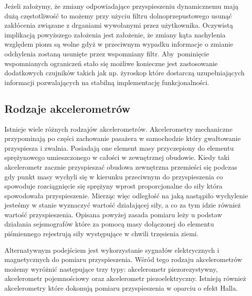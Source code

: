 Jeżeli założymy, że zmiany odpowiadające przyspieszeniu dynamicznemu mają dużą
częstotliwość to możemy przy użyciu filtru dolnoprzepustowego usunąć zakłócenia
związane z drganiami wywołanymi przez użytkownika. Oczywistą implikacją
powyższego założenia jest założenie, że zmiany kąta nachylenia względem pionu są
wolne gdyż w przeciwnym wypadku informacje o zmianie odchylenia zostaną
usunięte przez wspomniany filtr. Aby~pominięcie wspomnianych ograniczeń stało się możliwe
konieczne jest zastosowanie dodatkowych czujników takich jak np. żyroskop które
dostarczą uzupełniających informacji pozwalających na stabilną implementację
funkcjonalności.
\subsection{Rodzaje akcelerometrów}
Istnieje wiele różnych rodzajów akcelerometrów. Akcelerometry mechaniczne
przypominają po części zachowanie pasażera w samochodzie który gwałtowanie
przyspiesza i zwalnia. Posiadają one element masy przyczepiony do elementu
sprężynowego umieszczonego w całości w zewnętrznej obudowie. Kiedy taki
akcelerometr zacznie przyspieszać obudowa zewnętrzna przemieści się podczas gdy
punkt masy wychyli się w kierunku przeciwnym do przyspieszenia co spowoduje
rozciągnięcie się sprężyny wprost proporcjonalne do siły która spowodowała
przyspieszenie. Mierząc więc odległość na jaką nastąpiło wychylenie jesteśmy w
stanie wyznaczyć wartość działającej siły, a co za tym idzie również wartość
przyspieszenia. Opisana powyżej zasada pomiaru leży u podstaw działania
sejsmografów które za pomocą masy dołączonej do elementu piśmiennego rejestrują
siły występujące w chwili trzęsienia ziemi.

Alternatywnym podejściem jest wykorzystanie sygnałów elektrycznych i
magnetycznych do pomiaru przyspieszenia. Wśród tego rodzaju akcelerometrów
możemy wyróżnić następujące trzy typy: akcelerometr piezorezystywny,
akcelerometr pojemnościowy oraz akcelerometr piezoelektryczny. Istnieją również
akcelerometry które dokonują pomiaru przyspieszenia w oparciu o efekt Halla. 

